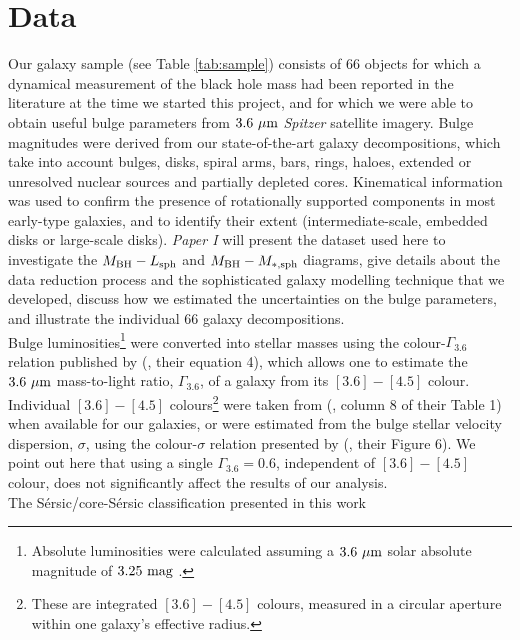 \documentclass[preprint2]{emulateapj}
\begin{document}
 

\section{Data}
\label{sec:data}
Our galaxy sample (see Table \ref{tab:sample}) 
consists of 66 objects for which a dynamical measurement of the black hole mass had been reported in the literature 
\citep{grahamscott2013,rusli2013bhmassesDM} at the time we started this project, 
and for which we were able to obtain useful bulge parameters from $3.6\rm~\mu m$ \emph{Spitzer} satellite imagery. 
Bulge magnitudes were derived from our state-of-the-art galaxy decompositions, which take into account 
bulges, disks, spiral arms, bars, rings, haloes, extended or unresolved nuclear sources and partially depleted cores.
Kinematical information \citep{atlas3dIII-MNRAS,scott2014,arnold2014} was used 
to confirm the presence of rotationally supported components in most early-type galaxies, 
and to identify their extent (intermediate-scale, embedded disks or large-scale disks). 
\emph{Paper I} will present the dataset used here to investigate the $M_{\rm BH} - L_{\rm sph}$ and $M_{\rm BH} - M_{\rm *,sph}$ diagrams, 
give details about the data reduction process and the sophisticated galaxy modelling technique that we developed, 
discuss how we estimated the uncertainties on the bulge parameters, 
and illustrate the individual 66 galaxy decompositions. \\
Bulge luminosities\footnote{Absolute luminosities were calculated assuming a $3.6\rm~\mu m$ solar absolute magnitude of $3.25\rm~mag$ \citep{sani2011}.} 
were converted into stellar masses using the colour-$\Gamma_{3.6}$ relation published by 
\citeauthor{meidt2014} (\citeyear{meidt2014}, their equation 4), 
which allows one to estimate the $3.6\rm~\mu m$ mass-to-light ratio, $\Gamma_{3.6}$, of a galaxy 
from its $[3.6] - [4.5]$ colour. 
Individual $[3.6] - [4.5]$ colours\footnote{These are integrated $[3.6] - [4.5]$ colours, measured in a circular aperture 
within one galaxy's effective radius.} were taken from 
\citeauthor{peletier2012} (\citeyear{peletier2012}, column 8 of their Table 1) 
when available for our galaxies, 
or were estimated from the bulge stellar velocity dispersion, $\sigma$, 
using the colour-$\sigma$ relation presented by \citeauthor{peletier2012} (\citeyear{peletier2012}, their Figure 6).
We point out here that using a single $\Gamma_{3.6} = 0.6$, independent of $[3.6] - [4.5]$ colour, 
does not significantly affect the results of our analysis. \\
The S\'ersic/core-S\'ersic classification presented in this work 
\end{document}
